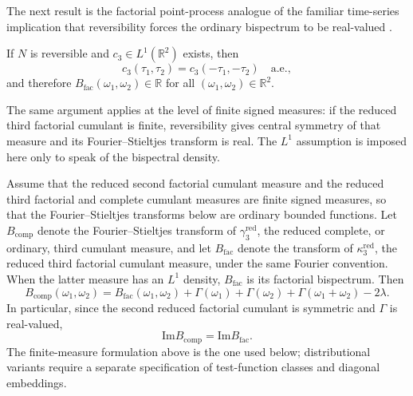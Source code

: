 \documentclass[aap,press]{apt} \volno{00} \partno{00}
\newcommand{\R}{\mathbb{R}}
\newcommand{\1}{\mathbf{1}}
\newcommand{\Imm}{\mathrm{Im}}
\numberwithin{equation}{section}
\begin{document}
The next result is the factorial point-process analogue of the familiar
time-series implication that reversibility forces the ordinary
bispectrum  to be real-valued
\cite{HinichRothman1998}.

\begin{thm}\label{thm:real-bispectrum}
If $N$ is reversible and $c_3\in L^1(\R^2)$ exists, then
\[
c_3(\tau_1,\tau_2)=c_3(-\tau_1,-\tau_2)\quad\text{a.e.},
\]
and therefore $B_{\mathrm{fac}}(\omega_1,\omega_2)\in\R$ for all $(\omega_1,\omega_2)\in\R^2$.
\end{thm}

\begin{rem}
The same argument applies at the level of finite signed measures: if the reduced third factorial cumulant is finite, reversibility gives central symmetry of that measure and its Fourier--Stieltjes transform is real. The $L^1$ assumption is imposed here only to speak of the bispectral density.
\end{rem}

\begin{lem}\label{lem:ordinary-factorial-bispectrum}
Assume that the reduced second factorial cumulant measure and the reduced third factorial and complete cumulant measures are finite signed measures, so that the Fourier--Stieltjes transforms below are ordinary bounded functions. Let $B_{\mathrm{comp}}$ denote the Fourier--Stieltjes transform of $\gamma_3^{\mathrm{red}}$, the reduced complete, or ordinary, third cumulant measure, and let $B_{\mathrm{fac}}$ denote the transform of $\kappa_3^{\mathrm{red}}$, the reduced third factorial cumulant measure, under the same Fourier convention. When the latter measure has an $L^1$ density, $B_{\mathrm{fac}}$ is its factorial bispectrum. Then
\begin{equation}\label{eq:complete-factorial-bispectrum-relation}
B_{\mathrm{comp}}(\omega_1,\omega_2)
=
B_{\mathrm{fac}}(\omega_1,\omega_2)
+\Gamma(\omega_1)+\Gamma(\omega_2)+\Gamma(\omega_1+\omega_2)-2\lambda.
\end{equation}
In particular, since the second reduced factorial cumulant is symmetric and $\Gamma$ is real-valued,
\[
\Imm B_{\mathrm{comp}}=\Imm B_{\mathrm{fac}}.
\]
The finite-measure formulation above is the one used below; distributional variants require a separate specification of test-function classes and diagonal embeddings.
\end{lem}
\end{document}
